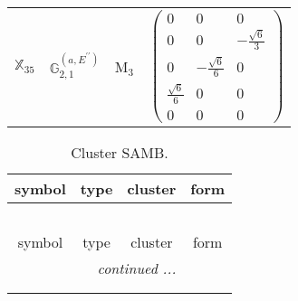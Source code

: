 \documentclass[fleqn,10pt,landscape]{article}
\begin{document}
\begin{itemize}
\begin{center}
\begin{longtable}{c|c|c|c}
$ \mathbb{X}_{35} $ & $\mathbb{G}_{2,1}^{(a,E^{\prime\prime})}$ & M$_{3}$ & $\begin{pmatrix} 0 & 0 & 0 \\ 0 & 0 & - \frac{\sqrt{6}}{3} \\ 0 & - \frac{\sqrt{6}}{6} & 0 \\ \frac{\sqrt{6}}{6} & 0 & 0 \\ 0 & 0 & 0 \end{pmatrix}$ \\
\end{longtable}
\end{center}
\begin{center}
\renewcommand{\arraystretch}{1.3}
\begin{longtable}{c|c|c|c}
\caption{Cluster SAMB.}
 \\
 \hline \hline
symbol & type & cluster & form \\ \hline \endfirsthead

\multicolumn{3}{l}{\tablename\ \thetable{}} \\
 \hline \hline
symbol & type & cluster & form \\ \hline \endhead

 \hline \hline
\multicolumn{3}{r}{\footnotesize\it continued ...} \\ \endfoot

 \hline \hline
\multicolumn{3}{r}{} \\ \endlastfoot


\end{longtable}
\end{center}
\end{itemize}
\end{document}
